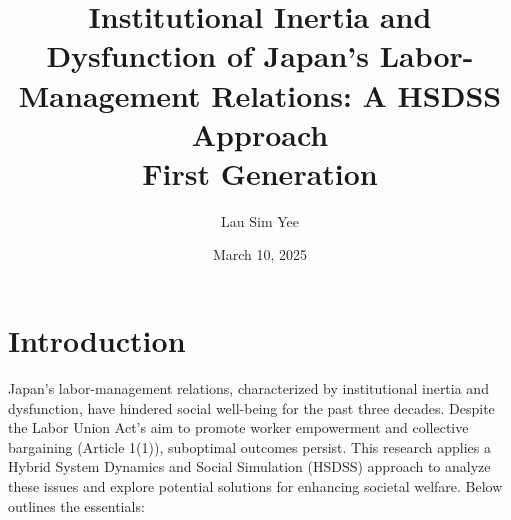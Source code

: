 \documentclass[10pt]{article}
\title{Institutional Inertia and Dysfunction of Japan’s Labor-Management Relations: A HSDSS Approach\\ First Generation}
\author{Lau Sim Yee}
\date{March 10, 2025}
\theoremstyle{definition}
\begin{document}
\maketitle %

\section*{Introduction}
Japan's labor-management relations, characterized by institutional inertia and dysfunction, have hindered social well-being for the past three decades.  Despite the Labor Union Act's aim to promote worker empowerment and collective bargaining (Article 1(1)), suboptimal outcomes persist. This research applies a  Hybrid System Dynamics and Social Simulation (HSDSS) approach to analyze these issues and explore potential solutions for enhancing societal welfare. Below outlines the essentials:
\end{document}

